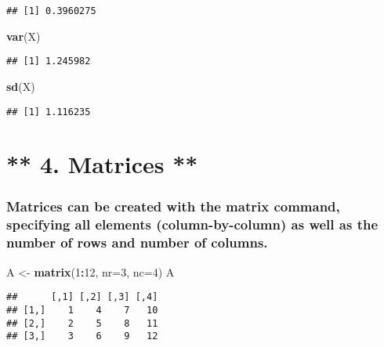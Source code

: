 \documentclass[]{article}
\newenvironment{Shaded}{\begin{snugshade}}{\end{snugshade}}
\newcommand{\KeywordTok}[1]{\textcolor[rgb]{0.13,0.29,0.53}{\textbf{#1}}}
\newcommand{\DataTypeTok}[1]{\textcolor[rgb]{0.13,0.29,0.53}{#1}}
\newcommand{\DecValTok}[1]{\textcolor[rgb]{0.00,0.00,0.81}{#1}}
\newcommand{\StringTok}[1]{\textcolor[rgb]{0.31,0.60,0.02}{#1}}
\newcommand{\OperatorTok}[1]{\textcolor[rgb]{0.81,0.36,0.00}{\textbf{#1}}}
\newcommand{\NormalTok}[1]{#1}
\begin{document}
\begin{verbatim}
## [1] 0.3960275
\end{verbatim}

\begin{Shaded}
\begin{Highlighting}[]
\KeywordTok{var}\NormalTok{(X)}
\end{Highlighting}
\end{Shaded}

\begin{verbatim}
## [1] 1.245982
\end{verbatim}

\begin{Shaded}
\begin{Highlighting}[]
\KeywordTok{sd}\NormalTok{(X)}
\end{Highlighting}
\end{Shaded}

\begin{verbatim}
## [1] 1.116235
\end{verbatim}

\section{** 4. Matrices **}\label{matrices}

\subsubsection{Matrices can be created with the matrix command,
specifying all elements (column-by-column) as well as the number of rows
and number of
columns.}\label{matrices-can-be-created-with-the-matrix-command-specifying-all-elements-column-by-column-as-well-as-the-number-of-rows-and-number-of-columns.}

\begin{Shaded}
\begin{Highlighting}[]
\NormalTok{A <-}\StringTok{ }\KeywordTok{matrix}\NormalTok{(}\DecValTok{1}\OperatorTok{:}\DecValTok{12}\NormalTok{, }\DataTypeTok{nr=}\DecValTok{3}\NormalTok{, }\DataTypeTok{nc=}\DecValTok{4}\NormalTok{)}
\NormalTok{A}
\end{Highlighting}
\end{Shaded}

\begin{verbatim}
##      [,1] [,2] [,3] [,4]
## [1,]    1    4    7   10
## [2,]    2    5    8   11
## [3,]    3    6    9   12
\end{verbatim}
\end{document}
